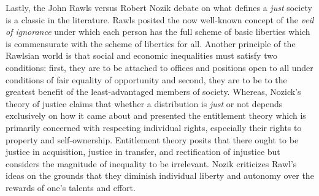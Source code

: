 \documentclass[12pt]{article}
\newcommand{\1}{\mathbbm 1}
\begin{document}
	
	
	Lastly, the John Rawls \cite{rawlstheory1971} versus Robert Nozik \cite{nozick1974anarchy} debate on what defines a \textit{just} society is a classic in the literature. Rawls posited the now well-known concept of the \textit{veil of ignorance} under which each person has the full scheme of basic liberties which is commensurate with the scheme of liberties for all. Another principle of the Rawlsian world is that social and economic inequalities must satisfy two conditions: first, they are to be attached to offices and positions open to all under conditions of fair equality of opportunity and second, they are to be to the greatest benefit of the least-advantaged members of society. Whereas, Nozick's \cite{nozick1974anarchy}  theory of  justice  claims that  whether  a  distribution  is  \textit{just}  or  not  depends exclusively  on  how  it came  about and presented the  entitlement  theory  which is primarily concerned with respecting individual rights, especially their rights to  property  and  self-ownership.  Entitlement theory posits that there ought to be justice in acquisition, justice in transfer,  and  rectification  of  injustice but considers the magnitude of inequality to be irrelevant. Nozik criticizes Rawl's ideas on the grounds that they diminish individual liberty and autonomy over the rewards of one's talents and effort.
	
	
	 
	
	
\end{document}
